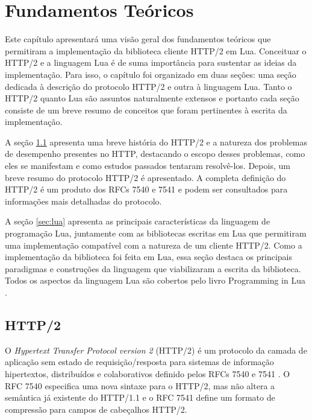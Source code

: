\chapter{Fundamentos Teóricos}
\label{cap:theory}

Este capítulo apresentará uma visão geral dos fundamentos teóricos que permitiram a implementação da biblioteca cliente HTTP/2 em Lua. Conceituar o HTTP/2 e a linguagem Lua é de suma importância para sustentar as ideias da implementação. Para isso, o capítulo foi organizado em duas seções: uma seção dedicada à descrição do protocolo HTTP/2 e outra à linguagem Lua. Tanto o HTTP/2 quanto Lua são assuntos naturalmente extensos e portanto cada seção consiste de um breve resumo de conceitos que foram pertinentes à escrita da implementação.

A seção \ref{sec:http2} apresenta uma breve história do HTTP/2 e a natureza dos problemas de desempenho presentes no HTTP, destacando o escopo desses problemas, como eles se manifestam e como estudos passados tentaram resolvê-los. Depois, um breve resumo do protocolo HTTP/2 é apresentado. A completa definição do HTTP/2 é um produto dos RFCs 7540 \cite{BelsheRFC7540} e 7541 \cite{BelsheRFC7541} e podem ser consultados para informações mais detalhadas do protocolo.

A seção \ref{sec:lua} apresenta as principais características da linguagem de programação Lua, juntamente com as bibliotecas escritas em Lua que permitiram uma implementação compatível com a natureza de um cliente HTTP/2. Como a implementação da biblioteca foi feita em Lua, essa seção destaca os principais paradigmas e construções da linguagem que viabilizaram a escrita da biblioteca. Todos os aspectos da linguagem Lua são cobertos pelo livro Programming in Lua \cite{Ierusalimschy2016PiL}.

\section{HTTP/2}
\label{sec:http2}

O {\em Hypertext Transfer Protocol version 2} (HTTP/2) é um protocolo da camada de aplicação sem estado de requisição/resposta para sistemas de informação hipertextos, distribuídos e colaborativos definido pelos RFCs 7540 \cite{BelsheRFC7540} e 7541 \cite{BelsheRFC7541}. O RFC 7540 especifica uma nova sintaxe para o HTTP/2, mas não altera a semântica já existente do HTTP/1.1 e o RFC 7541 define um formato de compressão para campos de cabeçalhos HTTP/2.

